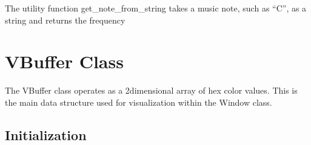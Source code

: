 \documentclass[letterpaper,10pt,english,openany,oneside]{sphinxmanual}
\begin{document}
\sphinxAtStartPar
The utility function get\_note\_from\_string takes a music note, such as “C”, as a string and returns the frequency
\def\sphinxLiteralBlockLabel{\label{\detokenize{fundamentals:id4}}}
\begin{sphinxVerbatim}[commandchars=\\\{\}]
   
    
   

  
\end{sphinxVerbatim}


\chapter{VBuffer Class}
\label{\detokenize{fundamentals:vbuffer-class}}
\sphinxAtStartPar
The VBuffer class operates as a 2\sphinxhyphen{}dimensional array of hex color values. This is the main data structure used for visualization within the Window class.


\section{Initialization}
\label{\detokenize{fundamentals:initialization}}
\def\sphinxLiteralBlockLabel{\label{\detokenize{fundamentals:id5}}}
\begin{sphinxVerbatim}[commandchars=\\\{\}]
   
\end{sphinxVerbatim}
\def\sphinxLiteralBlockLabel{\label{\detokenize{fundamentals:id6}}}
\begin{sphinxVerbatim}[commandchars=\\\{\}]
   
   
\end{sphinxVerbatim}
\def\sphinxLiteralBlockLabel{\label{\detokenize{fundamentals:id7}}}
\begin{sphinxVerbatim}[commandchars=\\\{\}]
   
\end{sphinxVerbatim}
\end{document}

